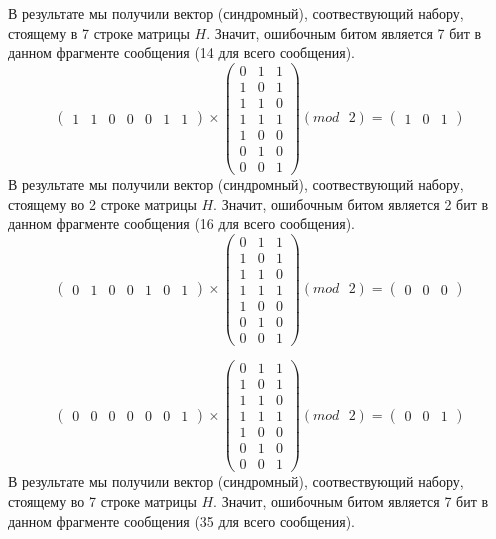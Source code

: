 \documentclass[a5paper, 10pt]{article}
\theoremstyle{definition}
\theoremstyle{plain}
\theoremstyle{remark}
\begin{document}
В результате мы получили вектор (синдромный), соотвествующий набору, стоящему в 7 строке матрицы $H$. Значит, ошибочным битом является 7 бит в данном фрагменте сообщения (14 для всего сообщения).\\
\begin{equation}
\begin{pmatrix}
1 & 1 & 0 & 0 & 0 & 1 & 1
\end{pmatrix}
 \times
\begin{pmatrix}
0 & 1 & 1\\
1 & 0 & 1\\
1 & 1 & 0\\
1 & 1 & 1 \\
1 & 0 & 0\\
0 & 1 & 0 \\
0 & 0 & 1
\end{pmatrix}
(mod \text{ }2)
= \begin{pmatrix}
1 & 0 & 1
\end{pmatrix}
\end{equation}
В результате мы получили вектор (синдромный), соотвествующий набору, стоящему во 2 строке матрицы $H$. Значит, ошибочным битом является 2 бит в данном фрагменте сообщения (16 для всего сообщения).\\
\begin{equation}
\begin{pmatrix}
0 & 1 & 0 & 0 & 1 & 0 & 1
\end{pmatrix}
 \times
\begin{pmatrix}
0 & 1 & 1\\
1 & 0 & 1\\
1 & 1 & 0\\
1 & 1 & 1 \\
1 & 0 & 0\\
0 & 1 & 0 \\
0 & 0 & 1
\end{pmatrix}
(mod \text{ }2)
= \begin{pmatrix}
0 & 0 & 0 
\end{pmatrix}
\end{equation}

\begin{equation}
\begin{pmatrix}
0 & 0 & 0 & 0 & 0 & 0 & 1
\end{pmatrix}
 \times
\begin{pmatrix}
0 & 1 & 1\\
1 & 0 & 1\\
1 & 1 & 0\\
1 & 1 & 1 \\
1 & 0 & 0\\
0 & 1 & 0 \\
0 & 0 & 1
\end{pmatrix}
(mod \text{ }2)
= \begin{pmatrix}
0 & 0 & 1
\end{pmatrix}
\end{equation}
В результате мы получили вектор (синдромный), соотвествующий набору, стоящему во 7 строке матрицы $H$. Значит, ошибочным битом является 7 бит в данном фрагменте сообщения (35 для всего сообщения).\\
\end{document}
